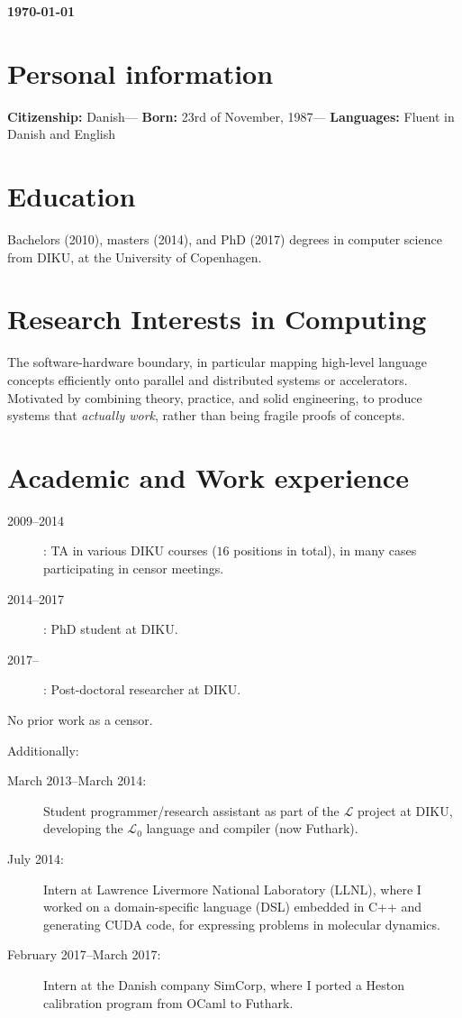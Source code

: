 \documentclass{resume} %
\author{Troels Henriksen}
\date{\today}
\renewcommand{\L}{$\mathcal{L}$}
\newcommand{\LO}{$\mathcal{L}_0$}
\begin{document}
\maketitle
\begin{center}
  \textbf{\today}
\end{center}
\section{Personal information}

\textbf{Citizenship:} Danish---
\textbf{Born:} 23rd of November, 1987---
\textbf{Languages:} Fluent in Danish and English

\section{Education}

Bachelors (2010), masters (2014), and PhD (2017) degrees in computer
science from DIKU, at the University of Copenhagen.

\section{Research Interests in Computing}

The software-hardware boundary, in particular mapping high-level
language concepts efficiently onto parallel and distributed systems or
accelerators.  Motivated by combining theory, practice, and solid
engineering, to produce systems that \textit{actually work}, rather
than being fragile proofs of concepts.

\section{Academic and Work experience}

\begin{description}
\item[2009--2014]: TA in various DIKU courses ($16$ positions in
  total), in many cases participating in censor meetings.
\item[2014--2017]: PhD student at DIKU.
\item[2017--]: Post-doctoral researcher at DIKU.
\end{description}

No prior work as a censor.

Additionally:

\begin{description}
\item[March 2013--March 2014:] Student programmer/research assistant as
  part of the \L{} project at DIKU, developing the \LO{} language and
  compiler (now Futhark).
\item[July 2014:] Intern at Lawrence Livermore National Laboratory
  (LLNL), where I worked on a domain-specific language (DSL) embedded
  in C++ and generating CUDA code, for expressing problems in
  molecular dynamics.
\item[February 2017--March 2017:] Intern at the Danish company
  SimCorp, where I ported a Heston calibration program from OCaml to
  Futhark.
\end{description}
\end{document}
